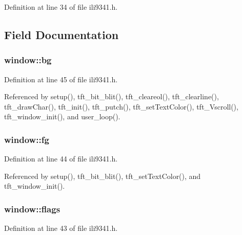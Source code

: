 Definition at line 34 of file ili9341.\+h.



\subsection{Field Documentation}
\subsubsection[{\texorpdfstring{bg}{bg}}]{ window\+::bg}\hypertarget{structwindow_affcf5d29153103c2537542f5a4f8ba87}{}\label{structwindow_affcf5d29153103c2537542f5a4f8ba87}


Definition at line 45 of file ili9341.\+h.



Referenced by setup(), tft\+\_\+bit\+\_\+blit(), tft\+\_\+cleareol(), tft\+\_\+clearline(), tft\+\_\+draw\+Char(), tft\+\_\+init(), tft\+\_\+putch(), tft\+\_\+set\+Text\+Color(), tft\+\_\+\+Vscroll(), tft\+\_\+window\+\_\+init(), and user\+\_\+loop().

\subsubsection[{\texorpdfstring{fg}{fg}}]{ window\+::fg}\hypertarget{structwindow_ac8739cdb3c50efcc1deaa5ab955a5e62}{}\label{structwindow_ac8739cdb3c50efcc1deaa5ab955a5e62}


Definition at line 44 of file ili9341.\+h.



Referenced by setup(), tft\+\_\+bit\+\_\+blit(), tft\+\_\+set\+Text\+Color(), and tft\+\_\+window\+\_\+init().

\subsubsection[{\texorpdfstring{flags}{flags}}]{ window\+::flags}\hypertarget{structwindow_ad58fae853f87093ef4f0139df0a3f33d}{}\label{structwindow_ad58fae853f87093ef4f0139df0a3f33d}


Definition at line 43 of file ili9341.\+h.



